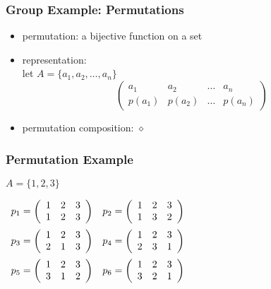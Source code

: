 \documentclass[dvipsnames]{beamer}
\begin{document}
\begin{frame}
  \frametitle{Group Example: Permutations}

  \begin{itemize}
    \item permutation: a bijective function on a set

    \medskip
    \item representation:\\
    let $A = \{a_1, a_2, \dots, a_n\}$
    \[\left(
      \begin{array}{cccc}
         a_1   &  a_2   & \dots &  a_n\\
        p(a_1) & p(a_2) & \dots & p(a_n)
      \end{array}
    \right)\]

    \pause
    \medskip
    \item permutation composition: $\diamond$
  \end{itemize}
\end{frame}

\begin{frame}
  \frametitle{Permutation Example}

  \begin{example}
    $A = \{1,2,3\}$

    \medskip
    $\begin{array}{cc}
      p_1 = \left(
        \begin{array}{ccc}
          1 & 2 & 3\\
          1 & 2 & 3
        \end{array}
      \right) &
      p_2 = \left(
        \begin{array}{ccc}
          1 & 2 & 3\\
          1 & 3 & 2
        \end{array}
      \right)\medskip\\
      p_3 = \left(
        \begin{array}{ccc}
          1 & 2 & 3\\
          2 & 1 & 3
        \end{array}
      \right) &
      p_4 = \left(
        \begin{array}{ccc}
          1 & 2 & 3\\
          2 & 3 & 1
        \end{array}
      \right)\medskip\\
      p_5 = \left(
        \begin{array}{ccc}
          1 & 2 & 3\\
          3 & 1 & 2
        \end{array}
      \right) &
      p_6 = \left(
        \begin{array}{ccc}
          1 & 2 & 3\\
          3 & 2 & 1
        \end{array}
      \right)
    \end{array}$
  \end{example}
\end{frame}
\end{document}
